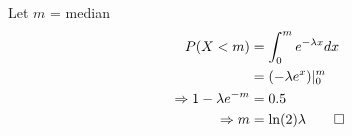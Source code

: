 \documentclass[paper=usletter, fontsize=12pt]{article}
\begin{document}
\begin{enumerate}
\begin{cproof}
            Let $m$ = median
            \begin{align*}
                P(X < m) & = \int_{0}^{m}e^{-\lambda x}dx\\
                & = (-\lambda e^{x})\vert_{0}^{m}\\
                \Rightarrow 1 - \lambda e^{-m} & = 0.5\\
                \Rightarrow m & = \ln(2)\lambda \qedhere
            \end{align*}
            \endgroup

        \end{cproof}

    \end{enumerate}
\end{document}
